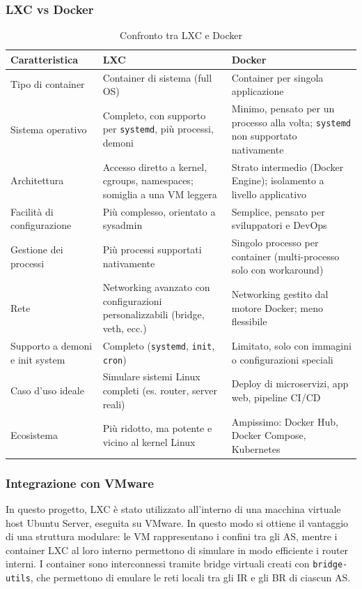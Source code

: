 \documentclass[12pt,a4paper,twoside]{book}
\begin{document}
\subsubsection{LXC vs Docker}
\begin{table}[H]
    \centering
    \label{tab:lxc-vs-docker}
    \renewcommand{\arraystretch}{1.3}
    \begin{tabular}{|p{4cm}|p{5cm}|p{5cm}|}
        \hline
        \textbf{Caratteristica} & \textbf{LXC} & \textbf{Docker} \\
        \hline
        Tipo di container & Container di sistema (full OS) & Container per singola applicazione \\
        \hline
        Sistema operativo & Completo, con supporto per \texttt{systemd}, più processi, demoni & Minimo, pensato per un processo alla volta; \texttt{systemd} non supportato nativamente \\
        \hline
        Architettura & Accesso diretto a kernel, cgroups, namespaces; somiglia a una VM leggera & Strato intermedio (Docker Engine); isolamento a livello applicativo \\
        \hline
        Facilità di configurazione & Più complesso, orientato a sysadmin & Semplice, pensato per sviluppatori e DevOps \\
        \hline
        Gestione dei processi & Più processi supportati nativamente & Singolo processo per container (multi-processo solo con workaround) \\
        \hline
        Rete & Networking avanzato con configurazioni personalizzabili (bridge, veth, ecc.) & Networking gestito dal motore Docker; meno flessibile \\
        \hline
        Supporto a demoni e init system & Completo (\texttt{systemd}, \texttt{init}, \texttt{cron}) & Limitato, solo con immagini o configurazioni speciali \\
        \hline
        Caso d’uso ideale & Simulare sistemi Linux completi (es. router, server reali) & Deploy di microservizi, app web, pipeline CI/CD \\
        \hline
        Ecosistema & Più ridotto, ma potente e vicino al kernel Linux & Ampissimo: Docker Hub, Docker Compose, Kubernetes \\
        \hline
    \end{tabular}
    \caption{Confronto tra LXC e Docker \cite{dockerLXC}} 
\end{table}

\subsubsection{Integrazione con VMware}
In questo progetto, LXC è stato utilizzato all’interno di una macchina virtuale host Ubuntu Server, eseguita su VMware. In questo modo si ottiene il vantaggio di una struttura modulare: le \ac{VM} rappresentano i confini tra gli \ac{AS}, mentre i container LXC al loro interno permettono di simulare in modo efficiente i router interni. I container sono interconnessi tramite bridge virtuali creati con \texttt{bridge-utils}, che permettono di emulare le reti locali tra gli \ac{IR} e gli \ac{BR} di ciascun \ac{AS}.
\end{document}
